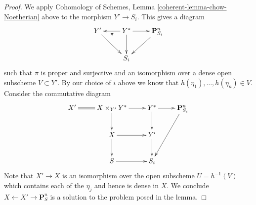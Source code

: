 \documentclass[10pt,a4paper]{amsart}
\theoremstyle{plain}
\theoremstyle{definition}
\theoremstyle{remark}
\numberwithin{equation}{subsection}
\begin{document}
\begin{proof}
\medskip\noindent
We apply Cohomology of Schemes, Lemma
\ref{coherent-lemma-chow-Noetherian} above to the morphism
$Y' \to S_i$. This gives a diagram
$$
\xymatrix{
Y' \ar[rd] & Y^* \ar[d] \ar[l]^\pi \ar[r] & \mathbf{P}^n_{S_i} \ar[dl] \\
& S_i &
}
$$
such that $\pi$ is proper and surjective and an isomorphism over
a dense open subscheme $V \subset Y'$. By our choice of $i$ above
we know that $h(\eta_1), \ldots, h(\eta_n) \in V$. Consider
the commutative diagram
$$
\xymatrix{
X' \ar@{=}[r] &
X \times_{Y'} Y^* \ar[r] \ar[d] &
Y^* \ar[r] \ar[d] &
\mathbf{P}^n_{S_i} \ar[ddl] \\
& X \ar[r] \ar[d] & Y' \ar[d] & \\
& S \ar[r] & S_i &
}
$$
Note that $X' \to X$ is an isomorphism over the open subscheme
$U = h^{-1}(V)$ which contains each of the $\eta_j$ and hence is
dense in $X$. We conclude $X \leftarrow X' \rightarrow \mathbf{P}^n_S$
is a solution to the problem posed in the lemma.
\end{proof}
\end{document}
